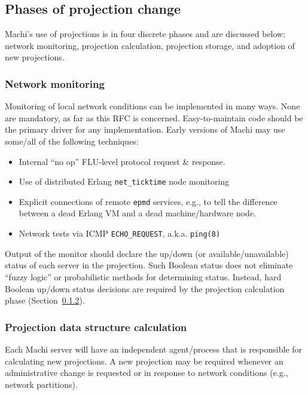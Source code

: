 \documentclass[preprint,10pt]{sigplanconf}
\begin{document}
\subsection{Phases of projection change}

Machi's use of projections is in four discrete phases and are
discussed below: network monitoring,
projection calculation, projection storage, and
adoption of new projections.

\subsubsection{Network monitoring}
\label{sub:network-monitoring}

Monitoring of local network conditions can be implemented in many
ways.  None are mandatory, as far as this RFC is concerned.
Easy-to-maintain code should be the primary driver for any
implementation.  Early versions of Machi may use some/all of the
following techniques:

\begin{itemize}
\item Internal ``no op'' FLU-level protocol request \& response.
\item Use of distributed Erlang {\tt net\_ticktime} node monitoring
\item Explicit connections of remote {\tt epmd} services, e.g., to
tell the difference between a dead Erlang VM and a dead
machine/hardware node.
\item Network tests via ICMP {\tt ECHO\_REQUEST}, a.k.a. {\tt ping(8)}
\end{itemize}

Output of the monitor should declare the up/down (or
available/unavailable) status of each server in the projection.  Such
Boolean status does not eliminate ``fuzzy logic'' or probabilistic
methods for determining status.  Instead, hard Boolean up/down status
decisions are required by the projection calculation phase
(Section~\ref{subsub:projection-calculation}).

\subsubsection{Projection data structure calculation}
\label{subsub:projection-calculation}

Each Machi server will have an independent agent/process that is
responsible for calculating new projections.  A new projection may be
required whenever an administrative change is requested or in response
to network conditions (e.g., network partitions).
\end{document}
